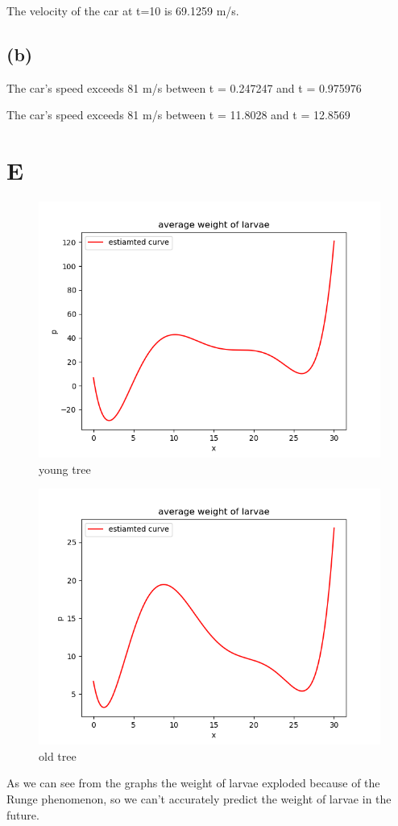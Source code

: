 \documentclass{article}
\begin{document}
    The velocity of the car at t=10 is 69.1259 m/s.

    \subsection{(b)}
    The car's speed exceeds 81 m/s between t = 0.247247 and t = 0.975976
    
    The car's speed exceeds 81 m/s between t = 11.8028 and t = 12.8569

\section{E}
    \begin{figure}[H]
        \centering
        \includegraphics{../code/output/E_0.png}
        \caption{young tree}
    \end{figure} 

    \begin{figure}[H]
        \centering
        \includegraphics{../code/output/E_1.png}
        \caption{old tree}
    \end{figure}

    As we can see from the graphs the weight of larvae exploded because of the Runge phenomenon,
    so we can't accurately predict the weight of larvae in the future.
\end{document}
